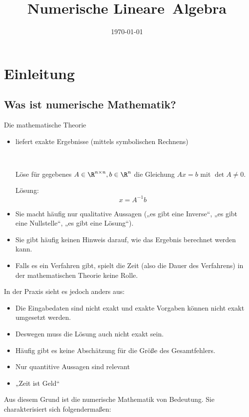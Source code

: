 \documentclass{mycourse}
\title{Numerische Lineare~Algebra}
\date{\today}
\begin{document}
\maketitle
\tableofcontents

\chapter{Einleitung}

\section{Was ist numerische Mathematik?}

Die mathematische Theorie
\begin{itemize}
\item liefert exakte Ergebnisse (mittels symbolischen Rechnens)
	\begin{ex*}~

		Löse für gegebenes $A\in \R^{n\times n}, b\in \R^n$ die Gleichung $Ax=b$ mit $\det A \neq 0$.

		Lösung:
		\[
			x=A^{-1}b
		\]
	\end{ex*}
\item Sie macht häufig nur qualitative Aussagen 
	(„es gibt eine Inverse“, „es gibt eine Nullstelle“, „es gibt eine Lösung“).
\item Sie gibt häufig keinen Hinweis darauf, wie das Ergebnis berechnet werden kann.
\item Falls es ein Verfahren gibt, spielt die Zeit (also die Dauer des Verfahrens) in der mathematischen Theorie keine Rolle.
\end{itemize}
In der Praxis sieht es jedoch anders aus:
\begin{itemize}
\item Die Eingabedaten sind nicht exakt und exakte Vorgaben können nicht exakt umgesetzt werden.
\item Deswegen muss die Lösung auch nicht exakt sein.
\item Häufig gibt es keine Abschätzung für die Größe des Gesamtfehlers.
\item Nur quantitive Aussagen sind relevant
\item „Zeit ist Geld“
\end{itemize}
Aus diesem Grund ist die numerische Mathematik von Bedeutung.
Sie charakterisiert sich folgendermaßen:
\end{document}
